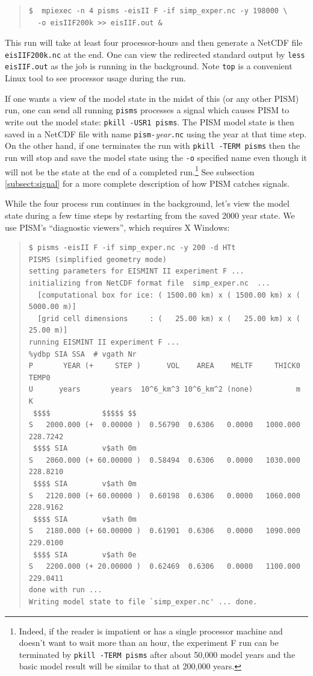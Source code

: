 \documentclass[11pt,final]{amsart}
\renewcommand{\t}[1]{\texttt{#1}}
\begin{document}
\small\begin{quote}\begin{verbatim}
$  mpiexec -n 4 pisms -eisII F -if simp_exper.nc -y 198000 \
  -o eisIIF200k >> eisIIF.out &
\end{verbatim}
\end{quote}\normalsize

This run will take at least four processor-hours and then generate a NetCDF file \verb|eisIIF200k.nc| at the end.  One can view the redirected standard output by \verb|less eisIIF.out| as the job is running in the background.  Note \t{top} is a convenient Linux tool to see processor usage during the run.

If one wants a view of the model state in the midst of this (or any other PISM) run, one can send all running \verb|pisms| processes a signal which causes PISM to write out the model state: \verb|pkill -USR1 pisms|.  The PISM model state is then saved in a NetCDF file with name \verb|pism-|\emph{year}\verb|.nc| using the year at that time step.  On the other hand, if one terminates the run with \verb|pkill -TERM pisms| then the run will stop and save the model state using the \verb|-o| specified name even though it will not be the state at the end of a completed run.\footnote{Indeed, if the reader is impatient or has a single processor machine and doesn't want to wait more than an hour, the experiment F run can be terminated by \t{pkill -TERM pisms} after about 50,000 model years and the basic model result will be similar to that at 200,000 years.}  See subsection \ref{subsect:signal} for a more complete description of how PISM catches signals.

While the four process run continues in the background, let's view the model state during a few time steps by restarting from the saved 2000 year state.  We use PISM's ``diagnostic viewers'', which requires X Windows:

\small\begin{quote}\begin{verbatim}
$ pisms -eisII F -if simp_exper.nc -y 200 -d HTt
PISMS (simplified geometry mode)
setting parameters for EISMINT II experiment F ... 
initializing from NetCDF format file  simp_exper.nc  ...
  [computational box for ice: ( 1500.00 km) x ( 1500.00 km) x ( 5000.00 m)]
  [grid cell dimensions     : (   25.00 km) x (   25.00 km) x (   25.00 m)]
running EISMINT II experiment F ...
%ydbp SIA SSA  # vgath Nr
P       YEAR (+     STEP )      VOL    AREA    MELTF     THICK0     TEMP0
U      years       years  10^6_km^3 10^6_km^2 (none)          m         K
 $$$$            $$$$$ $$
S   2000.000 (+  0.00000 )  0.56790  0.6306   0.0000   1000.000  228.7242
 $$$$ SIA        v$ath 0m
S   2060.000 (+ 60.00000 )  0.58494  0.6306   0.0000   1030.000  228.8210
 $$$$ SIA        v$ath 0m
S   2120.000 (+ 60.00000 )  0.60198  0.6306   0.0000   1060.000  228.9162
 $$$$ SIA        v$ath 0m
S   2180.000 (+ 60.00000 )  0.61901  0.6306   0.0000   1090.000  229.0100
 $$$$ SIA        v$ath 0e
S   2200.000 (+ 20.00000 )  0.62469  0.6306   0.0000   1100.000  229.0411
done with run ... 
Writing model state to file `simp_exper.nc' ... done.
\end{verbatim}
\end{quote}\normalsize
\end{document}
